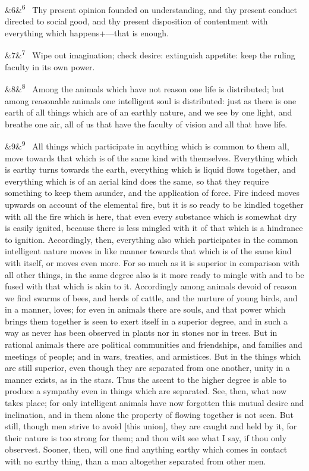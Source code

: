 \documentclass[12pt]{article}
\newcommand{\para}[1][]{\par\noindent\ifx&#1&\else\textsuperscript{\footnotesize #1}~\fi}
\begin{document}
\para[6] Thy present opinion founded on understanding, and thy present conduct
directed to social good, and thy present disposition of contentment with
everything which happens+---that is enough.

\para[7] Wipe out imagination; check desire: extinguish appetite: keep the
ruling faculty in its own power.

\para[8] Among the animals which have not reason one life is distributed; but
among reasonable animals one intelligent soul is distributed: just as
there is one earth of all things which are of an earthly nature, and we
see by one light, and breathe one air, all of us that have the faculty
of vision and all that have life.

\para[9] All things which participate in anything which is common to them all,
move towards that which is of the same kind with themselves. Everything
which is earthy turns towards the earth, everything which is liquid
flows together, and everything which is of an aerial kind does the
same, so that they require something to keep them asunder, and the
application of force. Fire indeed moves upwards on account of the
elemental fire, but it is so ready to be kindled together with all the
fire which is here, that even every substance which is somewhat dry is
easily ignited, because there is less mingled with it of that which is a
hindrance to ignition. Accordingly, then, everything also which
participates in the common intelligent nature moves in like manner
towards that which is of the same kind with itself, or moves even more.
For so much as it is superior in comparison with all other things, in
the same degree also is it more ready to mingle with and to be fused
with that which is akin to it. Accordingly among animals devoid of
reason we find swarms of bees, and herds of cattle, and the nurture of
young birds, and in a manner, loves; for even in animals there are
souls, and that power which brings them together is seen to exert itself
in a superior degree, and in such a way as never has been observed in
plants nor in stones nor in trees. But in rational animals there are
political communities and friendships, and families and meetings of
people; and in wars, treaties, and armistices. But in the things which
are still superior, even though they are separated from one another,
unity in a manner exists, as in the stars. Thus the ascent to the higher
degree is able to produce a sympathy even in things which are
separated. See, then, what now takes place; for only intelligent animals
have now forgotten this mutual desire and inclination, and in them alone
the property of flowing together is not seen. But still, though men
strive to avoid [this union], they are caught and held by it, for their
nature is too strong for them; and thou wilt see what I say, if thou
only observest. Sooner, then, will one find anything earthy which comes
in contact with no earthy thing, than a man altogether separated from
other men.
\end{document}
